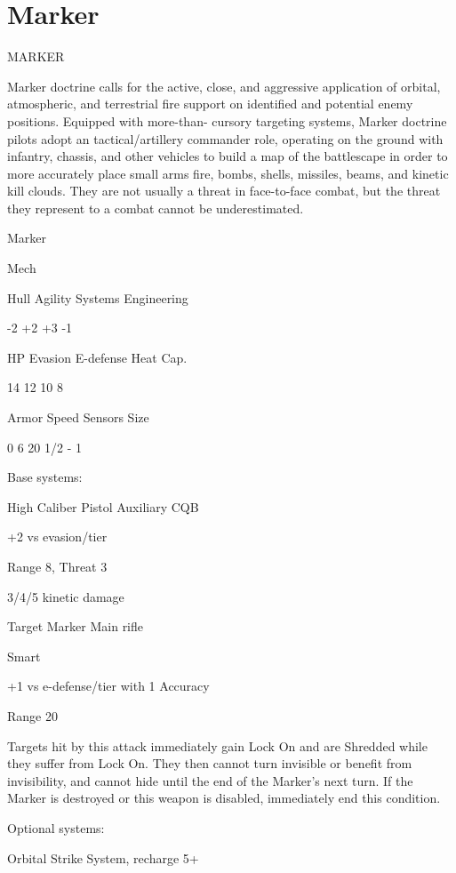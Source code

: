 \section{Marker}
                                                MARKER

Marker doctrine calls for the active, close, and aggressive application of orbital, atmospheric, and
terrestrial fire support on identified and potential enemy positions. Equipped with more-than-
cursory targeting systems, Marker doctrine pilots adopt an tactical/artillery commander role,
operating on the ground with infantry, chassis, and other vehicles to build a map of the
battlescape in order to more accurately place small arms fire, bombs, shells, missiles, beams, and
kinetic kill clouds. They are not usually a threat in face-to-face combat, but the threat they
represent to a combat cannot be underestimated.

       Marker

       Mech

       Hull       Agility     Systems       Engineering

       -2         +2          +3            -1

       HP         Evasion     E-defense     Heat Cap.

       14         12          10            8

       Armor      Speed       Sensors       Size

       0          6           20            1/2 - 1

Base systems:

High Caliber Pistol
Auxiliary CQB

+2 vs evasion/tier

Range 8, Threat 3

3/4/5 kinetic damage


Target Marker
Main rifle

Smart

+1 vs e-defense/tier with 1 Accuracy

Range 20

Targets hit by this attack immediately gain Lock On and are Shredded while they suffer from
Lock On. They then cannot turn invisible or benefit from invisibility, and cannot hide until the end
of the Marker’s next turn. If the Marker is destroyed or this weapon is disabled, immediately end
this condition.


Optional systems:




Orbital Strike
System, recharge 5+

